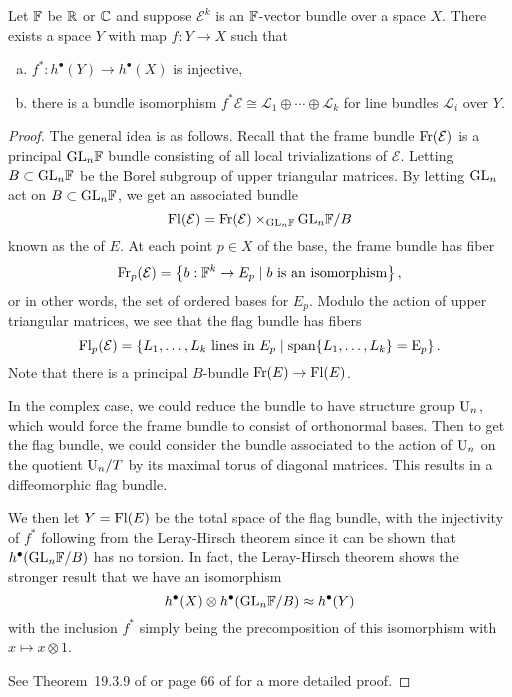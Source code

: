 \begin{theorem}
	Let $\mathbb{F}$ be $\mathbb{R}$ or $\mathbb{C}$ and suppose $\mathcal{E}^k$ is an $\mathbb{F}$-vector bundle over a space $X$. There exists a space $Y$ with map $f : Y \to X$ such that 
	\begin{enumerate}[(a)]
		\item $f^* : h^\bullet(Y) \to h^\bullet(X)$ is injective, 
		\item there is a bundle isomorphism $f^*\mathcal{E} \cong \mathcal{L}_1\oplus\cdots \oplus \mathcal{L}_k$ for line bundles $\mathcal{L}_i$ over $Y$.
	\end{enumerate}
\end{theorem}
\begin{proof}
	The general idea is as follows. Recall that the frame bundle $\operatorname{Fr}(\mathcal{E})$ is a principal $\mathrm{GL}_n\mathbb{F}$ bundle consisting of all local trivializations of $\mathcal{E}$. Letting $B\subset \mathrm{GL}_n \mathbb{F}$ be the Borel subgroup of upper triangular matrices. By letting $\mathrm{GL}_n$ act on $B\subset \mathrm{GL}_n\mathbb{F}$, we get an associated bundle
	\[
		\operatorname{Fl}(\mathcal{E}) = \operatorname{Fr}(\mathcal{E})\times_{\mathrm{GL}_n\mathbb{F}}{\mathrm{GL}_n\mathbb{F}/B}
	\]
	known as the  of $E$. At each point $p\in X$ of the base, the frame bundle has fiber
	\[
		\operatorname{Fr}_p(\mathcal{E}) = \left\{ b : \mathbb{F}^k \to E_p \mid b \textrm{ is an isomorphism}\right\},
	\]
	or in other words, the set of ordered bases for $E_p$. Modulo the action of upper triangular matrices, we see that the flag bundle has fibers
	\[
		\operatorname{Fl}_p(\mathcal{E}) = \left\{ L_1,\ldots, L_k \textrm{ lines in }E_p \mid \operatorname{span}\{L_1,\ldots, L_k\} = \mathrm{E}_p \right\}.
	\]
	Note that there is a principal $B$-bundle $\operatorname{Fr}(E)\to \operatorname{Fl}(E)$.

	\begin{remark}
		In the complex case, we could reduce the bundle to have structure group $\mathrm{U}_n$, which would force the frame bundle to consist of orthonormal bases. Then to get the flag bundle, we could consider the bundle associated to the action of $\mathrm{U}_n$ on the quotient $\mathrm{U}_n/T$ by its maximal torus of diagonal matrices. This results in a diffeomorphic flag bundle.
	\end{remark}

	We then let $Y=\operatorname{Fl}(E)$ be the total space of the flag bundle, with the injectivity of $f^*$ following from the Leray-Hirsch theorem since it can be shown that $h^\bullet(\mathrm{GL}_n\mathbb{F}/B)$ has no torsion. In fact, the Leray-Hirsch theorem shows the stronger result that we have an isomorphism
	\[
			h^\bullet(X)\otimes h^\bullet(\mathrm{GL}_n \mathbb{F}/B) \approx h^\bullet(Y)
	\]
	with the inclusion $f^*$ simply being the precomposition of this isomorphism with $x\mapsto x\otimes 1$.


	See Theorem~19.3.9 of \cite{dieck2008algebraic} or page 66 of \cite{hatcher2003ktheory} for a more detailed proof.
\end{proof}


